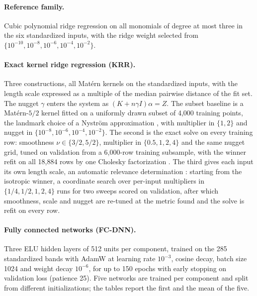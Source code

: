 \documentclass[11pt]{article}
\newcommand{\1}{\mathbf{1}}
\begin{document}
\paragraph{Reference family.} Cubic polynomial ridge regression \cite{hoerl} on all monomials of
degree at most three in the six standardized inputs, with the ridge weight selected from
$\{10^{-10},\allowbreak 10^{-8},\allowbreak 10^{-6},\allowbreak 10^{-4},\allowbreak 10^{-2}\}$.

\paragraph{Exact kernel ridge regression (KRR).} Three constructions, all Mat\'ern kernels \cite{stein}
on the standardized inputs, with the length scale expressed as a multiple of the median pairwise
distance of the fit set. The nugget $\gamma$ enters the system as $(K+n\gamma I)\alpha=Z$. The
subset baseline is a Mat\'ern-$5/2$ kernel fitted on a uniformly drawn subset of 4{,}000
training points, the landmark choice of a Nystr\"om approximation \cite{nystrom,drineas}, with
multiplier in $\{1,2\}$ and nugget in $\{10^{-8},10^{-6},10^{-4},10^{-2}\}$. The second is the
exact solve on every training row: smoothness $\nu\in\{3/2,5/2\}$, multiplier in
$\{0.5,1,2,4\}$ and the same nugget grid, tuned on validation from a 6{,}000-row training
subsample, with the winner refit on all 18{,}884 rows by one Cholesky factorization
\cite{golubvanloan}. The third gives each input its own length scale, an automatic relevance
determination \cite{neal,rw}: starting from the isotropic winner, a coordinate search over
per-input multipliers in $\{1/4,1/2,1,2,4\}$ runs for two sweeps scored on validation, after
which smoothness, scale and nugget are re-tuned at the metric found and the solve is refit on
every row.

\paragraph{Fully connected networks (FC-DNN).} Three ELU hidden layers of 512 units per component,
trained on the 285 standardized bands with AdamW \cite{adam,adamw} at learning rate $10^{-3}$,
cosine decay, batch size 1024 and weight decay $10^{-6}$, for up to 150 epochs with early
stopping on validation loss \cite{prechelt} (patience 25). Five networks are trained per
component and split from different initializations; the tables report the first and the mean
of the five.
\end{document}
